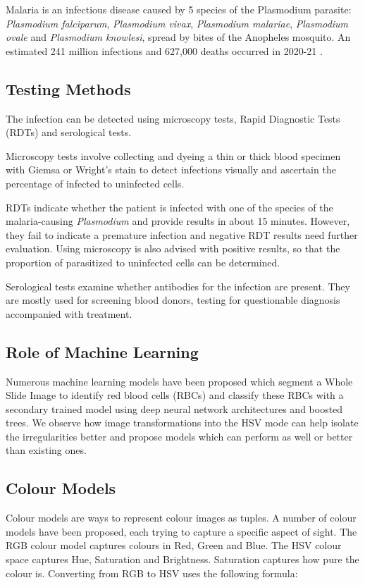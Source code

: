 \documentclass[10pt,twocolumn,letterpaper]{article}
\begin{document}
Malaria is an infectious disease caused by 5 species of the Plasmodium parasite: \textit{Plasmodium falciparum}, \textit{Plasmodium vivax}, \textit{Plasmodium malariae}, \textit{Plasmodium ovale} and \textit{Plasmodium knowlesi}, spread by bites of the Anopheles mosquito. An estimated 241 million infections and 627,000 deaths occurred in 2020-21 \cite{worldmalaria}. 

\subsection{Testing Methods}
The infection can be detected using microscopy tests, Rapid Diagnostic Tests (RDTs) and serological tests.\cite{cdcmalaria}

Microscopy tests involve collecting and dyeing a thin or thick blood specimen with Giemsa or Wright's stain to detect infections visually and ascertain the percentage of infected to uninfected cells.

RDTs indicate whether the patient is infected with one of the species of the malaria-causing \textit{Plasmodium} and provide results in about 15 minutes. However, they fail to indicate a premature infection and negative RDT results need further evaluation. Using microscopy is also advised with positive results, so that the proportion of parasitized to uninfected cells can be determined.

Serological tests examine whether antibodies for the infection are present. They are mostly used for screening blood donors, testing for questionable diagnosis accompanied with treatment.

\subsection{Role of Machine Learning}
Numerous machine learning models have been proposed which segment a Whole Slide Image to identify red blood cells (RBCs) and classify these RBCs with a secondary trained model using deep neural network architectures and boosted trees. We observe how image transformations into the HSV mode can help isolate the irregularities better and propose models which can perform as well or better than existing ones.

\subsection{Colour Models}
Colour models are ways to represent colour images as tuples\cite{enwiki:1091166634}. A number of colour models have been proposed, each trying to capture a specific aspect of sight. The RGB colour model captures colours in Red, Green and Blue. The HSV colour space captures Hue, Saturation and Brightness. Saturation captures how pure the colour is\cite{Kurniastuti_2022}. Converting from RGB to HSV uses the following formula:
\end{document}
